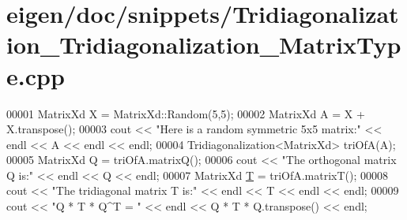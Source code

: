 \hypertarget{eigen_2doc_2snippets_2_tridiagonalization___tridiagonalization___matrix_type_8cpp_source}{}\section{eigen/doc/snippets/\+Tridiagonalization\+\_\+\+Tridiagonalization\+\_\+\+Matrix\+Type.cpp}
\label{eigen_2doc_2snippets_2_tridiagonalization___tridiagonalization___matrix_type_8cpp_source}

\begin{DoxyCode}
00001 MatrixXd X = MatrixXd::Random(5,5);
00002 MatrixXd A = X + X.transpose();
00003 cout << \textcolor{stringliteral}{"Here is a random symmetric 5x5 matrix:"} << endl << A << endl << endl;
00004 Tridiagonalization<MatrixXd> triOfA(A);
00005 MatrixXd Q = triOfA.matrixQ();
00006 cout << \textcolor{stringliteral}{"The orthogonal matrix Q is:"} << endl << Q << endl;
00007 MatrixXd \hyperlink{group___sparse_core___module_class_eigen_1_1_triplet}{T} = triOfA.matrixT();
00008 cout << \textcolor{stringliteral}{"The tridiagonal matrix T is:"} << endl << T << endl << endl;
00009 cout << \textcolor{stringliteral}{"Q * T * Q^T = "} << endl << Q * T * Q.transpose() << endl;
\end{DoxyCode}

